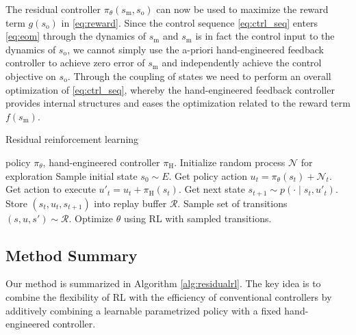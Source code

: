 The residual controller $\pi_\theta(s_\text{m}, s_\text{o})$ can now be used to maximize the reward term $g(s_\text{o})$ in \eqref{eq:reward}.
Since the control sequence \eqref{eq:ctrl_seq} enters \eqref{eq:eom} through the dynamics of $s_\text{m}$ and $s_\text{m}$ is in fact the control input to the dynamics of $s_\text{o}$, we cannot simply use the a-priori hand-engineered feedback controller to achieve zero error of $s_\text{m}$ and independently achieve the control objective on $s_\text{o}$.
Through the coupling of states we need to perform an overall optimization of \eqref{eq:ctrl_seq}, whereby the hand-engineered feedback controller provides internal structures and eases the optimization related to the reward term $f(s_\text{m})$.

\vspace*{.5cm}
\setlength{\textfloatsep}{0.09cm}
\begin{algorithm}
   	\caption{Residual reinforcement learning}
   	\label{alg:residualrl}
   	\begin{algorithmic}[1]
    \REQUIRE policy $\pi_\theta$, hand-engineered controller $\pi_\text{H}$.
        \STATE Initialize random process $\mathcal{N}$ for exploration
        \STATE Sample initial state $s_0 \sim E$.
            \STATE Get policy action $u_t = \pi_\theta(s_t) + \mathcal{N}_t$.
            \STATE Get action to execute $u'_t = u_t + \pi_\text{H}(s_t)$.
            \STATE Get next state $s_{t+1} \sim p(\cdot \mid s_t, u'_t)$.
            \STATE Store $(s_t, u_t, s_{t+1})$ into replay buffer $\mathcal R$.
            \STATE Sample set of transitions $(s, u, s') \sim \mathcal R$.
            \STATE Optimize $\theta$ using RL with sampled transitions.
        \ENDFOR
    \ENDFOR
   	\end{algorithmic}
\end{algorithm}
\setlength{\floatsep}{0.09cm}
\subsection{Method Summary}
Our method is summarized in Algorithm \ref{alg:residualrl}. The key idea is to combine the flexibility of RL with the efficiency of conventional controllers by additively combining a learnable parametrized policy with a fixed hand-engineered controller.

